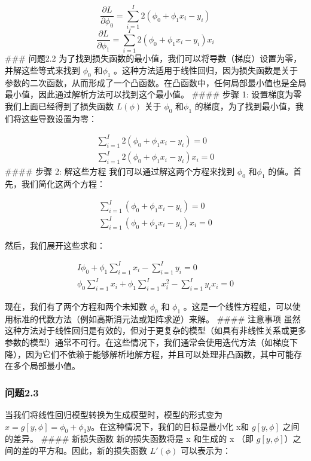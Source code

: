 \documentclass[
]{article}
\begin{document}
\[ \frac{\partial L}{\partial \phi_0} = \sum_{i=1}^{I} 2(\phi_0 + \phi_1 x_i - y_i) \]
\[ \frac{\partial L}{\partial \phi_1} = \sum_{i=1}^{I} 2(\phi_0 + \phi_1 x_i - y_i) x_i \]
\#\#\# 问题2.2
为了找到损失函数的最小值，我们可以将导数（梯度）设置为零，并解这些等式来找到
\(\phi_0\) 和\(\phi_1\)
。这种方法适用于线性回归，因为损失函数是关于参数的二次函数，从而形成了一个凸函数。在凸函数中，任何局部最小值也是全局最小值，因此通过解析方法可以找到这个最小值。
\#\#\#\# 步骤 1: 设置梯度为零 我们上面已经得到了损失函数 \(L(\phi)\)
关于 \(\phi_0\) 和\(\phi_1\)
的梯度，为了找到最小值，我们将这些导数设置为零：

\[
\begin{align}
\sum_{i=1}^{I} 2(\phi_0 + \phi_1 x_i - y_i) = 0 \\
\sum_{i=1}^{I} 2(\phi_0 + \phi_1 x_i - y_i) x_i  = 0
\end{align}
\] \#\#\#\# 步骤 2: 解这些方程 我们可以通过解这两个方程来找到 \(\phi_0\)
和\(\phi_1\) 的值。首先，我们简化这两个方程：

\[
\begin{align}
\sum_{i=1}^{I} (\phi_0 + \phi_1 x_i - y_i) = 0 \\
\sum_{i=1}^{I} (\phi_0 + \phi_1 x_i - y_i) x_i = 0
\end{align}
\]

然后，我们展开这些求和：

\[
\begin{align}
I\phi_0 + \phi_1 \sum_{i=1}^{I} x_i - \sum_{i=1}^{I} y_i = 0 \\
\phi_0 \sum_{i=1}^{I} x_i + \phi_1 \sum_{i=1}^{I} x_i^2 - \sum_{i=1}^{I} y_i x_i = 0
\end{align}
\]

现在，我们有了两个方程和两个未知数 \(\phi_0\) 和 \(\phi_1\)
。这是一个线性方程组，可以使用标准的代数方法（例如高斯消元法或矩阵求逆）来解。
\#\#\#\# 注意事项
虽然这种方法对于线性回归是有效的，但对于更复杂的模型（如具有非线性关系或更多参数的模型）通常不可行。在这些情况下，我们通常会使用迭代方法（如梯度下降），因为它们不依赖于能够解析地解方程，并且可以处理非凸函数，其中可能存在多个局部最小值。

\hypertarget{ux95eeux98982.3}{%
\subsubsection{问题2.3}\label{ux95eeux98982.3}}

当我们将线性回归模型转换为生成模型时，模型的形式变为
\(x = g[y, \phi] = \phi_0 + \phi_1 y\)。在这种情况下，我们的目标是最小化
x和 \(g[y, \phi]\) 之间的差异。 \#\#\#\# 新损失函数 新的损失函数将是 x
和生成的 x （即 \(g[y, \phi]\)）之间的差的平方和。因此，新的损失函数
\(L'(\phi)\) 可以表示为：
\end{document}
